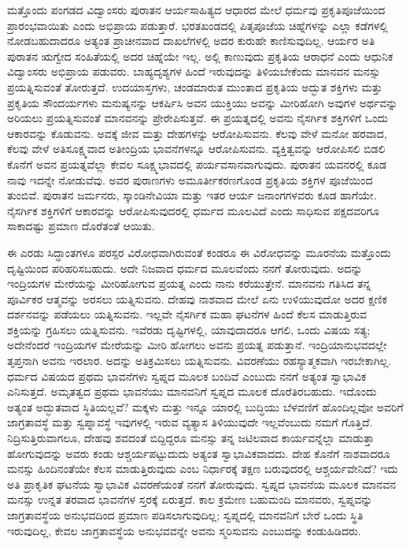 ಮತ್ತೊಂದು ಪಂಗಡದ ವಿದ್ವಾಂಸರು ಪುರಾತನ ಆರ್ಯಸಾಹಿತ್ಯದ ಆಧಾರದ ಮೇಲೆ ಧರ್ಮವು ಪ್ರಕೃತಿಪೂಜೆಯಿಂದ ಪ್ರಾರಂಭವಾಯಿತು ಎಂದು ಅಭಿಪ್ರಾಯ ಪಡುತ್ತಾರೆ. ಭರತಖಂಡದಲ್ಲಿ ಪಿತೃಪೂಜೆಯ ಚಿಹ್ನೆಗಳನ್ನು ಎಲ್ಲಾ ಕಡೆಗಳಲ್ಲಿ ನೋಡಬಹುದಾದರೂ ಅತ್ಯಂತ ಪ್ರಾಚೀನವಾದ ದಾಖಲೆಗಳಲ್ಲಿ ಅದರ ಕುರುಹೇ ಕಾಣಿಸುವುದಿಲ್ಲ. ಆರ್ಯರ ಅತಿ ಪುರಾತನ ಋಗ್ವೇದ ಸಂಹಿತೆಯಲ್ಲಿ ಅದರ ಚಿಹ್ನೆಯೇ ಇಲ್ಲ. ಅಲ್ಲಿ ಕಾಣುವುದು ಪ್ರಕೃತಿಯ ಆರಾಧನೆ ಎಂದು ಆಧುನಿಕ ವಿದ್ವಾಂಸರು ಅಭಿಪ್ರಾಯ ಪಡುವರು. ಬಾಹ್ಯದೃಶ್ಯಗಳ ಹಿಂದೆ ಇರುವುದನ್ನು ತಿಳಿಯಬೇಕೆಂದು ಮಾನವನ ಮನಸ್ಸು ಪ್ರಯತ್ನಿಸುವಂತೆ ತೋರುತ್ತದೆ. ಉದಯಾಸ್ತಗಳು, ಚಂಡಮಾರುತ ಮುಂತಾದ ಪ್ರಕೃತಿಯ ಅದ್ಭುತ ಶಕ್ತಿಗಳು ಮತ್ತು ಪ್ರಕೃತಿಯ ಸೌಂದರ್ಯಗಳು ಮನುಷ್ಯನನ್ನು ಆಕರ್ಷಿಸಿ ಅವನ ಯುಕ್ತಿಯು ಅವನ್ನು ಮೀರಿಹೋಗಿ ಅವುಗಳ ಅರ್ಥವನ್ನು ಅರಿಯಲು ಪ್ರಯತ್ನಿಸುವಂತೆ ಮಾನವನನ್ನು ಪ್ರೇರೇಪಿಸುತ್ತವೆ. ಈ ಪ್ರಯತ್ನದಲ್ಲಿ ಅವನು ನೈಸರ್ಗಿಕ ಶಕ್ತಿಗಳಿಗೆ ಒಂದು ಆಕಾರವನ್ನು ಕೊಡುವನು. ಅವಕ್ಕೆ ಜೀವ ಮತ್ತು ದೇಹಗಳನ್ನು ಆರೋಪಿಸುವನು. ಕೆಲವು ವೇಳೆ ಮನೋ ಹರವಾದ, ಕೆಲವು ವೇಳೆ ಅತಿಸೂಕ್ಷ್ಮವಾದ ಅತೀಂದ್ರಿಯ ಭಾವನೆಗಳನ್ನೂ ಆರೋಪಿಸುವನು. ವ್ಯಕ್ತಿತ್ವವನ್ನು ಆರೋಪಿಸಲಿ ಬಿಡಲಿ ಕೊನೆಗೆ ಅವನ ಪ್ರಯತ್ನವೆಲ್ಲಾ ಕೇವಲ ಸೂಕ್ಷ್ಮಭಾವದಲ್ಲಿ ಪರ್ಯವಸಾನವಾಗುವುದು. ಪುರಾತನ ಯವನರಲ್ಲಿ ಕೂಡ ನಾವು ಇದನ್ನೇ ನೋಡುವೆವು. ಅವರ ಪುರಾಣಗಳು ಅಮೂರ್ತೀಕರಣಗೊಂಡ ಪ್ರಕೃತಿಯ ಶಕ್ತಿಗಳ ಪೂಜೆಯಿಂದ ತುಂಬಿವೆ. ಪುರಾತನ ಜರ್ಮನರು, ಸ್ಕಾಂಡಿನೇವಿಯಾ ಮತ್ತು ಇತರ ಆರ್ಯ ಜನಾಂಗಗಳವರು ಕೂಡ ಹಾಗೆಯೇ. ನೈಸರ್ಗಿಕ ಶಕ್ತಿಗಳಿಗೆ ಆಕಾರವನ್ನು ಆರೋಪಿಸುವುದರಲ್ಲಿ ಧರ್ಮದ ಮೂಲವಿದೆ ಎಂದು ಸಾಧಿಸುವ ಪಕ್ಷದವರಿಗೂ ಸಾಕಾದಷ್ಟು ಪ್ರಮಾಣ ದೊರೆತಂತೆ ಆಯಿತು.

ಈ ಎರಡು ಸಿದ್ಧಾಂತಗಳೂ ಪರಸ್ಪರ ವಿರೋಧವಾಗಿರುವಂತೆ ಕಂಡರೂ ಈ ವಿರೋಧವನ್ನು ಮೂರನೆಯ ಮತ್ತೊಂದು ದೃಷ್ಟಿಯಿಂದ ಪರಿಹರಿಸಬಹುದು. ಅದೇ ನಿಜವಾದ ಧರ್ಮದ ಮೂಲವೆಂದು ನನಗೆ ತೋರುವುದು. ಅದನ್ನು ಇಂದ್ರಿಯಗಳ ಮೇರೆಯನ್ನು ಮೀರಿಹೋಗುವ ಪ್ರಯತ್ನ ಎಂದು ನಾನು ಕರೆಯುತ್ತೇನೆ. ಮಾನವನು ಗತಿಸಿದ ತನ್ನ ಪೂರ್ವಿಕರ ಆತ್ಮವನ್ನು ಅರಸಲು ಯತ್ನಿಸುವನು. ದೇಹವು ನಾಶವಾದ ಮೇಲೆ ಏನು ಉಳಿಯುವುದೋ ಅದರ ಕ್ಷಣಿಕ ದರ್ಶನವನ್ನು ಪಡೆಯಲು ಯತ್ನಿಸುವನು. ಇಲ್ಲವೇ ನೈಸರ್ಗಿಕ ಮಹಾ ಘಟನೆಗಳ ಹಿಂದೆ ಕೆಲಸ ಮಾಡುತ್ತಿರುವ ಶಕ್ತಿಯನ್ನು ಗ್ರಹಿಸಲು ಯತ್ನಿಸುವನು. ಇವೆರಡು ದೃಷ್ಟಿಗಳಲ್ಲಿ, ಯಾವುದಾದರೂ ಆಗಲಿ, ಒಂದು ವಿಷಯ ಸತ್ಯ; ಅದೇನೆಂದರೆ ಇಂದ್ರಿಯಗಳ ಮೇರೆಯನ್ನು ಮೀರಿ ಹೋಗಲು ಅವನು ಪ್ರಯತ್ನ ಪಡುತ್ತಾನೆ. ಇಂದ್ರಿಯಾನುಭವದಲ್ಲೇ ತೃಪ್ತನಾಗಿ ಅವನು ಇರಲಾರ. ಅದನ್ನು ಅತಿಕ್ರಮಿಸಲು ಯತ್ನಿಸುವನು. ವಿವರಣೆಯು ರಹಸ್ಯಾತ್ಮಕವಾಗಿ ಇರಬೇಕಾಗಿಲ್ಲ. ಧರ್ಮದ ವಿಷಯದ ಪ್ರಥಮ ಭಾವನೆಗಳು ಸ್ವಪ್ನದ ಮೂಲಕ ಬಂದಿವೆ ಎಂಬುದು ನನಗೆ ಅತ್ಯಂತ ಸ್ವಾಭಾವಿಕ ಎನಿಸುತ್ತದೆ. ಅಮೃತತ್ವದ ಪ್ರಥಮ ಭಾವನೆಯು ಮಾನವನಿಗೆ ಸ್ವಪ್ನದ ಮೂಲಕ ದೊರೆತಿರಬಹುದು. ಇದೊಂದು ಅತ್ಯಂತ ಅದ್ಭುತವಾದ ಸ್ಥಿತಿಯಲ್ಲವೆ? ಮಕ್ಕಳು ಮತ್ತು ಇನ್ನೂ ಯಾರಲ್ಲಿ ಬುದ್ಧಿಯು ಬೆಳವಣಿಗೆ ಹೊಂದಿಲ್ಲವೋ ಅವರಿಗೆ ಜಾಗ್ರತಾವಸ್ಥೆ ಮತ್ತು ಸ್ವಪ್ನಾವಸ್ಥೆ ಇವುಗಳಲ್ಲಿ ಇರುವ ವ್ಯತ್ಯಾಸ ತಿಳಿಯುವುದೇ ಇಲ್ಲವೆಂಬುದು ನಮಗೆ ಗೊತ್ತಿದೆ. ನಿದ್ರಿಸುತ್ತಿರುವಾಗಲೂ, ದೇಹವು ಶವದಂತೆ ಬಿದ್ದಿದ್ದರೂ ಮನಸ್ಸು ತನ್ನ ಜಟಿಲವಾದ ಕಾರ್ಯವನ್ನೆಲ್ಲಾ ಮಾಡುತ್ತಾ ಹೋಗುವುದನ್ನು ಅವರು ಕಂಡು ಆಶ್ಚರ್ಯಪಟ್ಟುದುದು ಅತ್ಯಂತ ಸ್ವಾಭಾವಿಕವಾದದು. ದೇಹ ಕೊನೆಗೆ ನಾಶವಾದರೂ ಮನಸ್ಸು ಹಿಂದಿನಂತೆಯೇ ಕೆಲಸ ಮಾಡುತ್ತಿರುವುದು ಎಂಬ ನಿರ್ಧಾರಕ್ಕೆ ತಕ್ಷಣ ಬರುವುದರಲ್ಲಿ ಆಶ್ಚರ್ಯವೇನಿದೆ? ಇದು ಅತಿ ಪ್ರಾಕೃತಿಕ ಘಟನೆಯ ಸ್ವಾಭಾವಿಕ ವಿವರಣೆಯಂತೆ ನನಗೆ ತೋರುವುದು. ಸ್ವಪ್ನದ ಭಾವನೆಯ ಮೂಲಕ ಮಾನವನ ಮನಸ್ಸು ಉನ್ನತ ತರವಾದ ಭಾವನೆಗಳ ಸ್ತರಕ್ಕೆ ಏರುತ್ತದೆ. ಕಾಲ ಕ್ರಮೇಣ ಬಹುಮಂದಿ ಮಾನವರು, ಸ್ವಪ್ನವನ್ನು ಜಾಗ್ರತಾವಸ್ಥೆಯ ಅನುಭವದಿಂದ ಪ್ರಮಾಣ ಪಡಿಸಲಾಗುವುದಿಲ್ಲ; ಸ್ವಪ್ನದಲ್ಲಿ ಮಾನವನಿಗೆ ಬೇರೆ ಒಂದು ಸ್ಥಿತಿ ಇರುವುದಿಲ್ಲ, ಕೇವಲ ಜಾಗ್ರತಾವಸ್ಥೆಯ ಅನುಭವವನ್ನೇ ಅವನು ಸ್ಮರಿಸುವನು ಎಂಬುದನ್ನು ಕಂಡುಹಿಡಿದರು.

